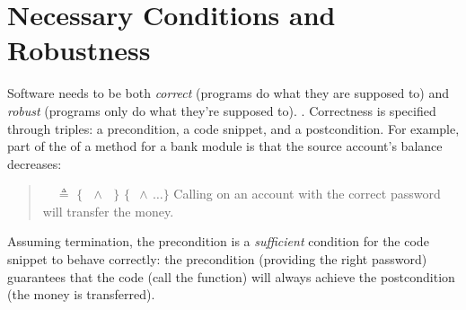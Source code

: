 \section{Necessary Conditions and Robustness}
\label{s:intro}




{Software needs} to be both {\emph{correct}} ({programs do what they
  are supposed to}) and {\emph{robust}} ({programs only do what
  they're supposed to}). .
{Correctness is}  specified
through  triples: a  precondition, a code snippet, and a
 postcondition. 
 For example,  {part of the \funcSpec
   of a  method for a bank module is that the source account's balance decreases:}
 \begin{quote}
   \Scorrect\ \ $\triangleq$  
 {\footnotesize{ $\{\,$ $\,\wedge\,$ $\,\}$  $\{$ $\,\wedge\,\dots \}$ }} Calling  on  {an account with the correct password} will transfer the money.
\end{quote}
Assuming termination, the precondition is a \emph{sufficient} condition for the {code snippet to behave correctly}: 
the precondition (\eg providing the right 
password) guarantees that
the code (\eg call the  function)
will always achieve the postcondition (the money is transferred).
 
